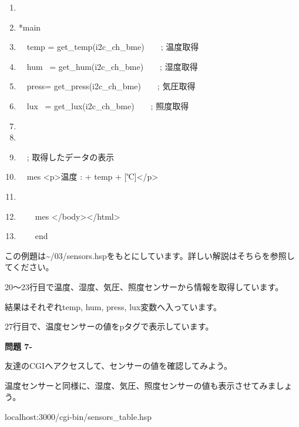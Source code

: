 \documentclass[a4paper,12pt,dvipdfmx]{jarticle}
\newcounter{Question}
\renewcommand\theQuestion{\textbf{問題 7-\arabic{Question}}}
\begin{document}
\begin{boxedminipage}{16.81cm}
\begin{enumerate}
	\item

	\item*main

	\item\ \ temp = get\_temp(i2c\_ch\_bme)\ \ \ \ ; 温度取得
	\item\ \ hum \ = get\_hum(i2c\_ch\_bme)\ \ \ \ ; 湿度取得
	\item\ \ press= get\_press(i2c\_ch\_bme)\ \ \ \ ; 気圧取得
	\item\ \ lux \ = get\_lux(i2c\_ch\_bme)\ \ \ \ ; 照度取得

	\item

	\item

	\item\ \ ; 取得したデータの表示

	\item\ \ mes {\textquotedbl}{\textless}p{\textgreater}温度 : {\textquotedbl} + temp + {\textquotedbl}
	[℃]{\textless}/p{\textgreater}{\textquotedbl}

	\item

	\item\ \ \ \ mes {\textquotedbl}{\textless}/body{\textgreater}{\textless}/html{\textgreater}{\textquotedbl}

	\item\ \ \ \ end
	\end{enumerate}
\end{boxedminipage}
\flushleft
この例題は{\textasciitilde}/03/sensors.hspをもとにしています。詳しい解説はそちらを参照してください。

20～23行目で温度、湿度、気圧、照度センサーから情報を取得しています。

結果はそれぞれtemp, hum, press,
lux変数へ入っています。

27行目で、温度センサーの値をpタグで表示しています。

\bigskip


\bigskip


\bigskip

\clearpage
{}\theQuestion

友達のCGIへアクセスして、センサーの値を確認してみよう。

温度センサーと同様に、湿度、気圧、照度センサーの値も表示させてみましょう。

\begin{center}
	\begin{boxedminipage}{0.5\textwidth}
		localhost:3000/cgi-bin/sensors\_table.hsp
	\end{boxedminipage}
\end{center}
\end{document}
